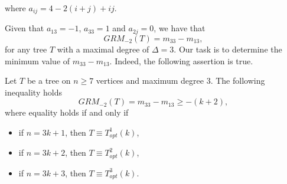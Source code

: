\documentclass[preprint,12pt]{elsarticle}
\begin{document}
where $a_{ij} = 4 - 2(i+j) + ij$.

Given that  $a_{13} = -1$, $a_{33} = 1$ and $a_{2j}=0$, we have that 
$$
GRM_{-2}(T)=m_{33}- m_{13},
$$
for any tree $T$ with a maximal degree of $\Delta=3$. Our task is to determine the minimum value of $m_{33}- m_{13}$.
Indeed, the following assertion is true.

\begin{theorem}
Let $T$ be a tree on $n \geq 7$ vertices and maximum degree 3. The following inequality holds
$$GRM_{-2}(T) =  m_{33} - m_{13} \geq -(k + 2),$$
where equality holds if and only if
\begin{itemize}
\item if $n = 3k+ 1$, then $T \equiv T^1_{opt} (k)$,
\item if $n = 3k+ 2$, then $T \equiv T^2_{opt} (k)$,
\item if $n = 3k+ 3$, then $T \equiv T^3_{opt} (k)$.
\end{itemize}
\end{theorem}
\end{document}
